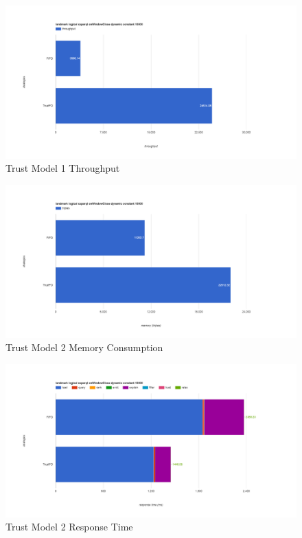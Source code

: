\begin{figure}[!htbp]
	\centering
    \includegraphics[width=\textwidth]{img/app3-trust-1-t.png}
    \caption{Trust Model 1 Throughput}
\end{figure}
\begin{figure}[!htbp]
	\centering
    \includegraphics[width=\textwidth]{img/app3-trust-2-m.png}
    \caption{Trust Model 2 Memory Consumption}
\end{figure}
\begin{figure}[!htbp]
	\centering
    \includegraphics[width=\textwidth]{img/app3-trust-2-r.png}
    \caption{Trust Model 2 Response Time}
\end{figure}

